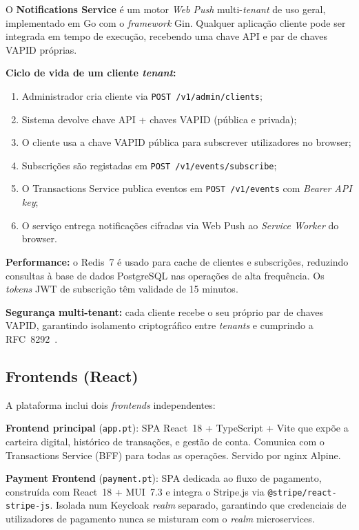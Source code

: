 \documentclass[12pt,a4paper]{article}
\begin{document}
O \textbf{Notifications Service} é um motor \emph{Web Push} multi-\emph{tenant} de uso
geral, implementado em Go com o \emph{framework} Gin. Qualquer aplicação cliente pode ser
integrada em tempo de execução, recebendo uma chave API e par de chaves VAPID próprias.

\textbf{Ciclo de vida de um cliente \emph{tenant}:}
\begin{enumerate}[noitemsep]
  \item Administrador cria cliente via \texttt{POST /v1/admin/clients};
  \item Sistema devolve chave API + chaves VAPID (pública e privada);
  \item O cliente usa a chave VAPID pública para subscrever utilizadores no browser;
  \item Subscrições são registadas em \texttt{POST /v1/events/subscribe};
  \item O Transactions Service publica eventos em \texttt{POST /v1/events} com \emph{Bearer API key};
  \item O serviço entrega notificações cifradas via Web Push ao \emph{Service Worker} do browser.
\end{enumerate}

\textbf{Performance:} o Redis~7 é usado para cache de clientes e subscrições, reduzindo
consultas à base de dados PostgreSQL nas operações de alta frequência. Os \emph{tokens} JWT
de subscrição têm validade de 15 minutos.

\textbf{Segurança multi-tenant:} cada cliente recebe o seu próprio par de chaves VAPID,
garantindo isolamento criptográfico entre \emph{tenants} e cumprindo a RFC~8292~\cite{rfc8292}.

\subsection{Frontends (React)}

A plataforma inclui dois \emph{frontends} independentes:

\textbf{Frontend principal} (\texttt{app.pt}): SPA React~18 + TypeScript + Vite que
expõe a carteira digital, histórico de transações, e gestão de conta. Comunica com o
Transactions Service (BFF) para todas as operações. Servido por nginx Alpine.

\textbf{Payment Frontend} (\texttt{payment.pt}): SPA dedicada ao fluxo de pagamento,
construída com React~18 + MUI~7.3 e integra o Stripe.js via
\texttt{@stripe/react-stripe-js}. Isolada num Keycloak \emph{realm} separado, garantindo
que credenciais de utilizadores de pagamento nunca se misturam com o \emph{realm}
microservices.
\end{document}
